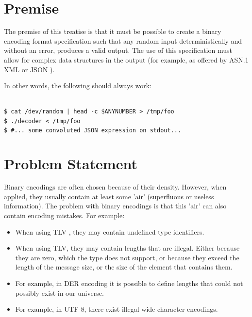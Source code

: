 \section{Premise}

The premise of this treatise is that it must be possible to create
a binary encoding format specification such that any random input 
deterministically and without an error, produces a valid output.
The use of this specification must allow for complex data structures
in the output (for example, as offered by ASN.1 \cite{bib:asn1}
  XML \cite{bib:xml} or JSON \cite{bib:json}).

In other words, the following should always work:

\begin{changemargin}{-60mm}{0mm}
\begin{myquote}
\begin{verbatim}

$ cat /dev/random | head -c $ANYNUMBER > /tmp/foo
$ ./decoder < /tmp/foo
$ #... some convoluted JSON expression on stdout...

\end{verbatim}
\end{myquote}
\end{changemargin}

\section{Problem Statement}

Binary encodings are often chosen because of their density.
However, when applied, they usually contain at least some 'air'
(superfluous or useless information).
The problem with binary encodings is that this 'air' can also contain
encoding mistakes. For example:

\begin{itemize}
\item When using TLV \cite{bib:tlv}, they may contain undefined type identifiers.
\item When using TLV, they may contain lengths that are illegal.
  Either because they are zero, which the type does not support,
  or because they exceed the length of the message size, or
  the size of the element that contains them.
\item For example, in DER \cite{bib:ber} encoding it is possible to define lengths
  that could not possibly exist in our universe.
\item For example, in UTF-8, there exist illegal wide character encodings.
\end{itemize}

